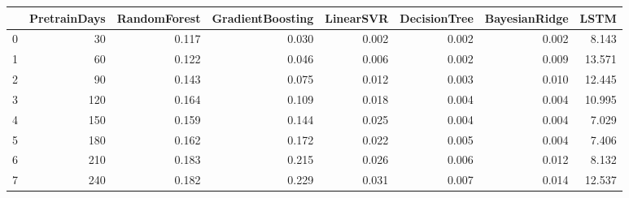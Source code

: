 \begin{tabular}{lrrrrrrr}
\toprule
{} &  PretrainDays &  RandomForest &  GradientBoosting &  LinearSVR &  DecisionTree &  BayesianRidge &   LSTM \\
\midrule
0 &            30 &         0.117 &             0.030 &      0.002 &         0.002 &          0.002 &  8.143 \\
1 &            60 &         0.122 &             0.046 &      0.006 &         0.002 &          0.009 & 13.571 \\
2 &            90 &         0.143 &             0.075 &      0.012 &         0.003 &          0.010 & 12.445 \\
3 &           120 &         0.164 &             0.109 &      0.018 &         0.004 &          0.004 & 10.995 \\
4 &           150 &         0.159 &             0.144 &      0.025 &         0.004 &          0.004 &  7.029 \\
5 &           180 &         0.162 &             0.172 &      0.022 &         0.005 &          0.004 &  7.406 \\
6 &           210 &         0.183 &             0.215 &      0.026 &         0.006 &          0.012 &  8.132 \\
7 &           240 &         0.182 &             0.229 &      0.031 &         0.007 &          0.014 & 12.537 \\
\bottomrule
\end{tabular}
